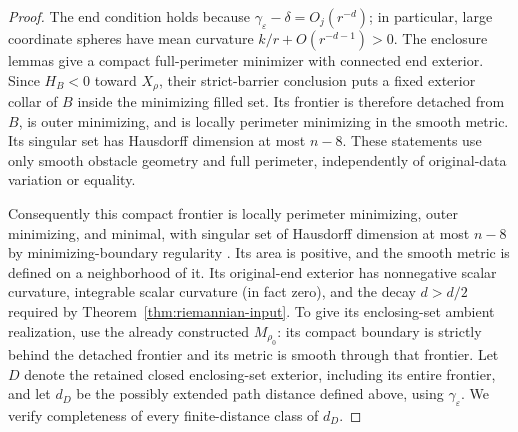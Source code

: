 \begin{proof}
The end condition holds because
$\gamma_\varepsilon-\delta=O_j(r^{-d})$; in particular, large
coordinate spheres have mean curvature $k/r+O(r^{-d-1})>0$.
The enclosure lemmas give a compact full-perimeter minimizer with
connected end exterior.  Since $H_B<0$ toward $X_\rho$, their
strict-barrier conclusion puts a fixed exterior collar of $B$ inside
the minimizing filled set.  Its frontier is therefore detached from
$B$, is outer minimizing, and is locally perimeter minimizing in the
smooth metric.  Its singular set has Hausdorff dimension at most
$n-8$.  These statements use only smooth obstacle geometry and full
perimeter, independently of original-data variation or equality.

Consequently this compact frontier is locally perimeter minimizing,
outer minimizing, and minimal, with singular set of Hausdorff
dimension at most $n-8$ by minimizing-boundary regularity
\cite{Simon2018}.  Its area is positive, and the smooth metric is
defined on a neighborhood of it.  Its original-end exterior has
nonnegative scalar curvature, integrable scalar curvature (in fact
zero), and the decay $d>d/2$ required by
Theorem~\ref{thm:riemannian-input}.  To give its enclosing-set ambient realization,
use the already constructed $M_{\rho_0}$: its compact boundary is
strictly behind the detached frontier and its metric is smooth through
that frontier.  Let $D$ denote the retained closed enclosing-set
exterior, including its entire frontier, and let $d_D$ be the possibly
extended path distance defined above, using $\gamma_\varepsilon$.
We verify completeness of every finite-distance class of $d_D$.


\end{proof}
